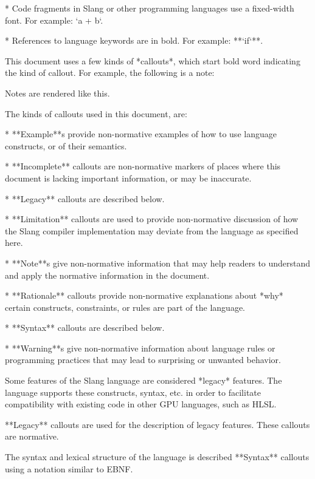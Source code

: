 * Code fragments in Slang or other programming languages use a fixed-width font. For example: `a + b`.

* References to language keywords are in bold. For example: **`if`**.


This document uses a few kinds of *callouts*, which start bold word indicating the kind of callout. For example, the following is a note:

\begin{Note}
Notes are rendered like this.
\end{Note}

The kinds of callouts used in this document, are:

* **Example**s provide non-normative examples of how to use language constructs, or of their semantics.

* **Incomplete** callouts are non-normative markers of places where this document is lacking important information, or may be inaccurate.

* **Legacy** callouts are described below.

* **Limitation** callouts are used to provide non-normative discussion of how the Slang compiler implementation may deviate from the language as specified here.

* **Note**s give non-normative information that may help readers to understand and apply the normative information in the document.

* **Rationale** callouts provide non-normative explanations about *why* certain constructs, constraints, or rules are part of the language.

* **Syntax** callouts are described below.

* **Warning**s give non-normative information about language rules or programming practices that may lead to surprising or unwanted behavior.


Some features of the Slang language are considered *legacy* features.
The language supports these constructs, syntax, etc. in order to facilitate compatibility with existing code in other GPU languages, such as HLSL.

**Legacy** callouts are used for the description of legacy features. These callouts are normative.


The syntax and lexical structure of the language is described **Syntax** callouts using a notation similar to EBNF.

